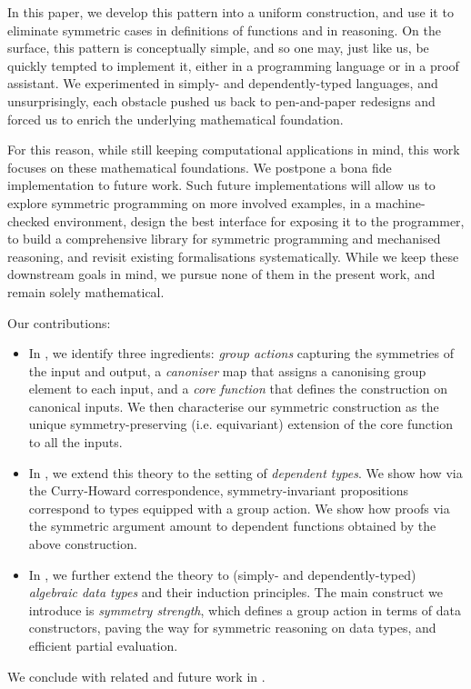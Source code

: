 In this paper, we develop this pattern into a uniform construction, and
use it to eliminate symmetric cases in definitions of functions and in reasoning.
On the surface, this pattern is conceptually simple, and so one may,
just like us, be quickly tempted to implement it, either in a
programming language or in a proof assistant. We
experimented in simply- and dependently-typed languages, and
unsurprisingly, each obstacle pushed us back to pen-and-paper redesigns and
forced us to enrich the underlying mathematical foundation.

For this reason, while still keeping computational applications in
mind, this work focuses on these mathematical foundations.
We postpone a bona fide implementation to future work. Such future
implementations will allow us to explore symmetric programming on more
involved examples, in a machine-checked environment, design the best
interface for exposing it to the programmer, to build a comprehensive
library for symmetric programming and mechanised reasoning, and
revisit existing \WLOG formalisations systematically. While we keep these
downstream goals in mind, we pursue none of them in the
present work, and remain solely mathematical.

Our contributions:
\begin{itemize}
  \item In , we identify three ingredients:
    \emph{group actions} capturing the symmetries of the input and
    output, a \emph{canoniser} map that assigns a canonising group
    element to each input, and a \emph{core function} that defines the
    construction on canonical inputs. We then characterise our symmetric \WLOG{}
    construction as the unique symmetry-preserving
    (i.e. equivariant) extension of the core function to all the inputs.
  \item In , we extend this theory to the
    setting of \emph{dependent types}. We show how via
    the Curry-Howard correspondence, symmetry-invariant propositions
    correspond to types equipped with a group action. We show how proofs
    via the symmetric \WLOG{} argument amount to dependent functions obtained by
    the above construction.
  \item In , we further extend the theory
    to (simply- and dependently-typed) \emph{algebraic data types} and
    their induction principles. The main construct we introduce is
    \emph{symmetry strength}, which defines a group action in terms of
    data constructors, paving the way for symmetric reasoning on data types,
    and efficient partial evaluation.
\end{itemize}
%
We conclude with related and future work in .


